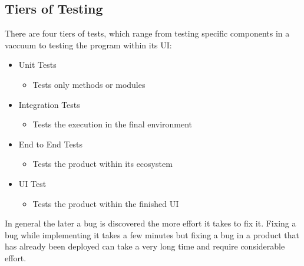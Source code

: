 \documentclass{article}
\begin{document}
 	\subsection{Tiers of Testing}
 	There are four tiers of tests, which range from testing specific components in a vaccuum to testing the program within its UI:
 	\begin{itemize}
 		\item{Unit Tests}
 		\begin{itemize}
 			\item{Tests only methods or modules}
 		\end{itemize}
 		\item{Integration Tests}
 		\begin{itemize}
 			\item{Tests the execution in the final environment}
 		\end{itemize}
 		\item{End to End Tests}
 		\begin{itemize}
 			\item{Tests the product within its ecosystem}
 		\end{itemize}
 		\item{UI Test}
 		\begin{itemize}
 			\item{Tests the product within the finished UI}
 		\end{itemize}
 	\end{itemize}
 	In general the later a bug is discovered the more effort it takes to fix it. Fixing a bug while implementing it takes a few minutes but fixing a bug in a product that has already been deployed can take a very long time and require considerable effort.
\end{document}
